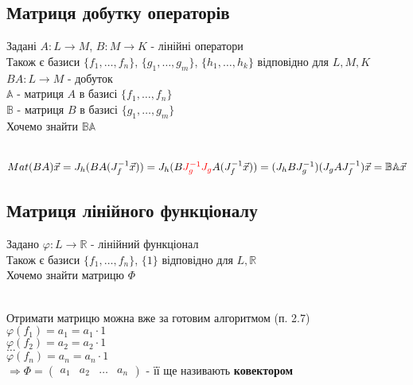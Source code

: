 \documentclass[a4paper, 14pt]{extarticle}
\def\bigline{\vspace{5mm}\\}
\begin{document}
	\subsection{Матриця добутку операторів}
	Задані $A: L \to M$, $B: M \to K$ - лінійні оператори\\
	Також є базиси $\{f_1,\dots, f_n\}$, $\{g_1,\dots, g_m\}$, $\{h_1,\dots, h_k\}$ відповідно для $L,M,K$\\
	$BA: L \to M$ - добуток\\
	$\mathbb{A}$ - матриця $A$ в базисі $\{f_1,\dots,f_n\}$\\
	$\mathbb{B}$ - матриця $B$ в базисі $\{g_1,\dots,g_m\}$\\
	Хочемо знайти $\mathbb{B} \mathbb{A}$\\
	\\
	$Mat(BA)\vec{x} = J_h(BA(J_f^{-1} \vec{x})) = J_h(B \textcolor{red}{J_g^{-1} J_g} A(J_f^{-1} \vec{x})) = (J_h B J_g^{-1})(J_g A J_f^{-1}) \vec{x} \\ = \mathbb{B} \mathbb{A} \vec{x}$
	\subsection{Матриця лінійного функціоналу}
	Задано $\varphi: L \to \mathbb{R}$ - лінійний функціонал\\
	Також є базиси $\{f_1,\dots,f_n\}$, $\{1\}$ відповідно для $L,\mathbb{R}$\\
	Хочемо знайти матрицю $\Phi$\\
	\\
Отримати матрицю можна вже за готовим алгоритмом (п. 2.7)\\
	$\varphi(f_1) = a_1 = a_1 \cdot 1$\\
	$\varphi(f_2) = a_2 = a_2 \cdot 1$\\
	$\dots$\\
	$\varphi(f_n) = a_n = a_n \cdot 1$\\
	$\Rightarrow \Phi = \begin{pmatrix} a_1 & a_2 & \dots & a_n \end{pmatrix}$ - її ще називають \textbf{ковектором}
	\bigline
\end{document}

